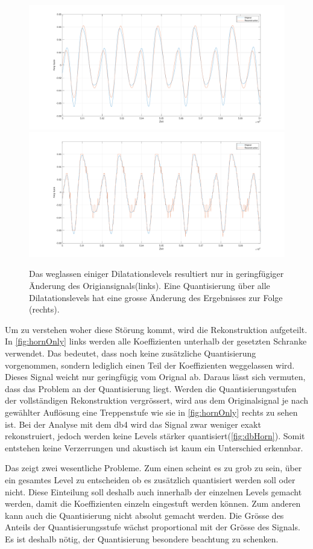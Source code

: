 \begin{refsection}
\begin{figure}
	\includegraphics[width=0.5\linewidth]{papers/compress/Bilder/hornOnlyLevs.pdf}
	\includegraphics[width=0.5\linewidth]{papers/compress/Bilder/hornOnlyQuant.pdf}
	\caption{Das weglassen einiger Dilatationslevels resultiert nur in geringfügiger Änderung des Origiansignals(links).
		Eine Quantisierung über alle Dilatationslevels hat eine grosse Änderung des Ergebnisses zur Folge (rechts).}
	\label{fig:hornOnly}
\end{figure}
Um zu verstehen woher diese Störung kommt, wird die Rekonstruktion aufgeteilt.
In \autoref{fig:hornOnly} links werden alle Koeffizienten unterhalb der gesetzten Schranke verwendet. 
Das bedeutet, dass noch keine zusätzliche Quantisierung vorgenommen, sondern lediglich einen Teil der Koeffizienten weggelassen wird.
Dieses Signal weicht nur geringfügig vom Orignal ab.
Daraus lässt sich vermuten, dass das Problem an der Quantisierung liegt.
Werden die Quantisierungsstufen der vollständigen Rekonstruktion vergrössert, wird aus dem Originalsignal je nach gewählter Auflösung eine Treppenstufe wie sie in \autoref{fig:hornOnly} rechts zu sehen ist.
Bei der Analyse mit dem db4 wird das Signal zwar weniger exakt rekonstruiert, jedoch werden keine Levels stärker quantisiert(\autoref{fig:dbHorn}).
Somit entstehen keine Verzerrungen und akustisch ist kaum ein Unterschied erkennbar.

Das zeigt zwei wesentliche Probleme.
Zum einen scheint es zu grob zu sein, über ein gesamtes Level zu entscheiden ob es zusätzlich quantisiert werden soll oder nicht.
Diese Einteilung soll deshalb auch innerhalb der einzelnen Levels gemacht werden, damit die Koeffizienten einzeln eingestuft werden können.
Zum anderen kann auch die Quantisierung nicht absolut gemacht werden.
Die Grösse des Anteils der Quantisierungsstufe wächst proportional mit der Grösse des Signals.
Es ist deshalb nötig, der Quantisierung besondere beachtung zu schenken.


\end{refsection}
